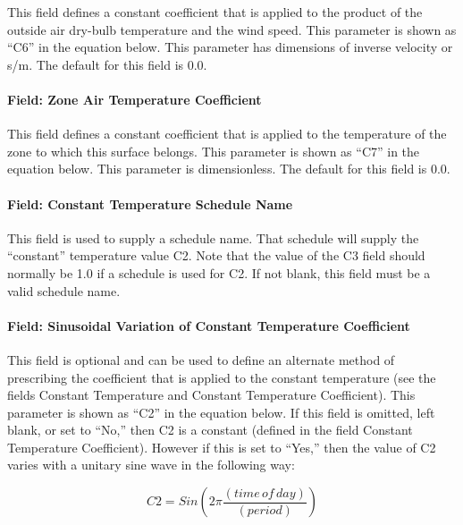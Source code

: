 This field defines a constant coefficient that is applied to the product of the outside air dry-bulb temperature and the wind speed. This parameter is shown as ``C6'' in the equation below. This parameter has dimensions of inverse velocity or s/m. The default for this field is 0.0.

\paragraph{Field: Zone Air Temperature Coefficient}\label{field-zone-air-temperature-coefficient}

This field defines a constant coefficient that is applied to the temperature of the zone to which this surface belongs. This parameter is shown as ``C7'' in the equation below. This parameter is dimensionless. The default for this field is 0.0.

\paragraph{Field: Constant Temperature Schedule Name}\label{field-constant-temperature-schedule-name}

This field is used to supply a schedule name. That schedule will supply the ``constant'' temperature value C2. Note that the value of the C3 field should normally be 1.0 if a schedule is used for C2. If not blank, this field must be a valid schedule name.

\paragraph{Field: Sinusoidal Variation of Constant Temperature Coefficient}\label{field-sinusoidal-variation-of-constant-temperature-coefficient}

This field is optional and can be used to define an alternate method of prescribing the coefficient that is applied to the constant temperature (see the fields Constant Temperature and Constant Temperature Coefficient). This parameter is shown as ``C2'' in the equation below. If this field is omitted, left blank, or set to ``No,'' then C2 is a constant (defined in the field Constant Temperature Coefficient). However if this is set to ``Yes,'' then the value of C2 varies with a unitary sine wave in the following way:

\begin{equation}
C2 = Sin\left( {2\pi \frac{{\left( {time\,of\,day} \right)}}{{\left( {period} \right)}}} \right)
\end{equation}


